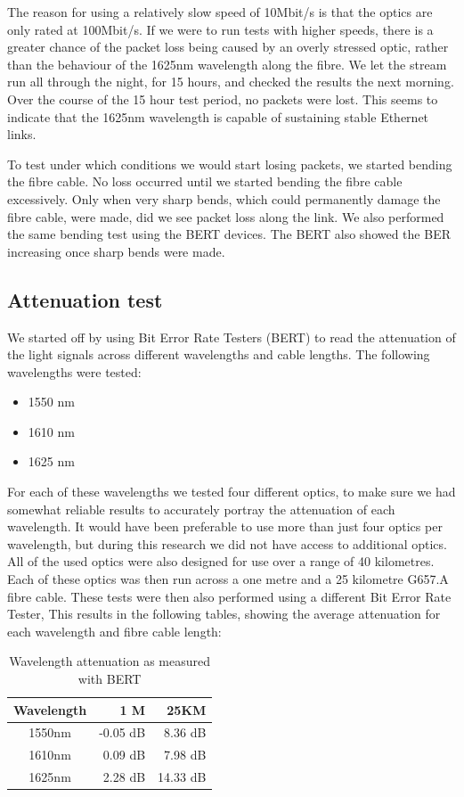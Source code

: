 \documentclass{article}
\begin{document}
The reason for using a relatively slow speed of 10Mbit/s is that the optics are only rated at 100Mbit/s.
If we were to run tests with higher speeds, there is a greater chance of the packet loss being caused by an overly stressed optic, rather than the behaviour of the 1625nm wavelength along the fibre.
We let the stream run all through the night, for 15 hours, and checked the results the next morning.
Over the course of the 15 hour test period, no packets were lost.
This seems to indicate that the 1625nm wavelength is capable of sustaining stable Ethernet links.

To test under which conditions we would start losing packets, we started bending the fibre cable.
No loss occurred until we started bending the fibre cable excessively.
Only when very sharp bends, which could permanently damage the fibre cable, were made, did we see packet loss along the link.
We also performed the same bending test using the BERT devices.
The BERT also showed the BER increasing once sharp bends were made.

\subsection{Attenuation test}
We started off by using Bit Error Rate Testers (BERT) to read the attenuation of the light signals across different wavelengths and cable lengths.
The following wavelengths were tested:
\begin{itemize}
	\item 1550 nm
	\item 1610 nm
	\item 1625 nm
\end{itemize}

For each of these wavelengths we tested four different optics, to make sure we had somewhat reliable results to accurately portray the attenuation of each wavelength.
It would have been preferable to use more than just four optics per wavelength, but during this research we did not have access to additional optics.
All of the used optics were also designed for use over a range of 40 kilometres.
Each of these optics was then run across a one metre and a 25 kilometre G657.A fibre cable.
These tests were then also performed using a different Bit Error Rate Tester, 
This results in the following tables, showing the average attenuation for each wavelength and fibre cable length:

\begin{table}[h]
\centering
\label{tab:attenuation-table-ber}
\begin{tabular}{|c|r|r|}
\hline 
\textbf{Wavelength} & \textbf{1 M} & \textbf{25KM}\\ 
\hline 
1550nm & -0.05 dB & 8.36 dB\\ 
\hline 
1610nm & 0.09 dB & 7.98 dB\\ 
\hline 
1625nm & 2.28 dB & 14.33 dB\\
\hline
\end{tabular} 
\caption{Wavelength attenuation as measured with BERT}
\end{table}
\end{document}
